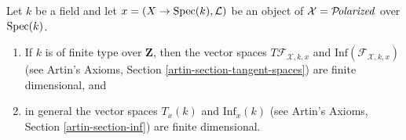 \begin{lemma}
\label{lemma-polarized-tangent-space}
Let $k$ be a field and let $x = (X \to \mathop{\mathrm{Spec}}(k), \mathcal{L})$
be an object of $\mathcal{X} = \mathcal{P}\!\mathit{olarized}$ over $\mathop{\mathrm{Spec}}(k)$.
\begin{enumerate}
\item If $k$ is of finite type over $\mathbf{Z}$, then
the vector spaces $T\mathcal{F}_{\mathcal{X}, k, x}$ and
$\text{Inf}(\mathcal{F}_{\mathcal{X}, k, x})$
(see Artin's Axioms, Section \ref{artin-section-tangent-spaces})
are finite dimensional, and
\item in general the vector spaces $T_x(k)$ and $\text{Inf}_x(k)$
(see Artin's Axioms, Section \ref{artin-section-inf})
are finite dimensional.
\end{enumerate}
\end{lemma}

